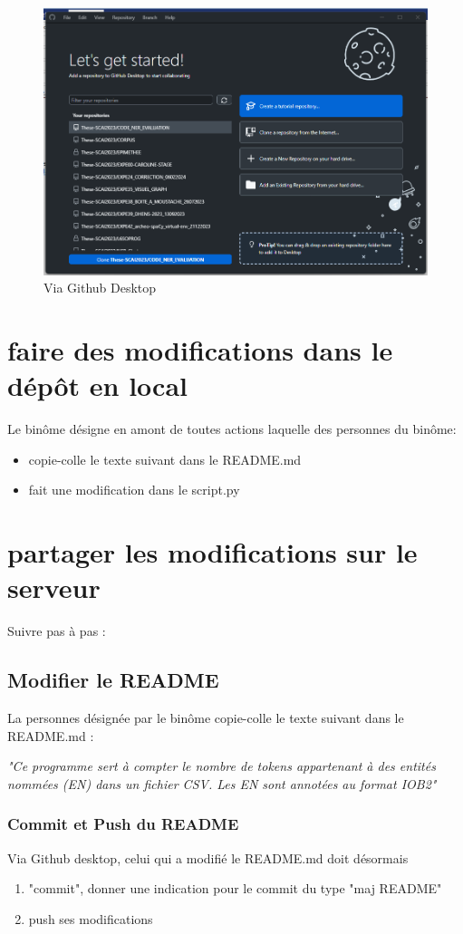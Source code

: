 \begin{figure}[H]
\caption{Via Github Desktop}
  \includegraphics[width=12cm]{images/github_desktop_connect2.png}
\end{figure}


\section{faire des modifications dans le dépôt en local}

Le binôme désigne en amont de toutes actions laquelle des personnes du binôme:
\begin{itemize}
\item copie-colle le texte suivant dans le README.md
\item fait une modification dans le script.py
\end{itemize}


\section{partager les modifications sur le serveur}

Suivre pas à pas :

\subsection{Modifier le README}

La personnes désignée par le binôme copie-colle le texte suivant dans le README.md : 


\textit{"Ce programme sert à compter le nombre de tokens appartenant à des entités nommées (EN) dans un fichier CSV. Les EN sont annotées au format IOB2" }

\subsubsection{Commit et Push du README}
Via Github desktop, celui qui a modifié le README.md doit désormais 
\begin{enumerate}
\item "commit", donner une indication pour le commit du type "maj README"
\item push ses modifications
\end{enumerate}

